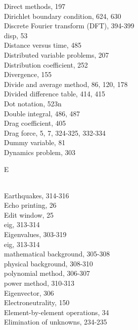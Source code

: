 \documentclass[../main.tex]{subfiles}
\begin{document}
\begin{multicols}{3}
    Direct methods, 197\\
    Dirichlet boundary condition, 624, 630\\
    Discrete Fourier transform (DFT), 394-399\\
    disp, 53\\
    Distance versus time, 485\\
    Distributed variable problems, 207\\
    Distribution coefficient, 252\\
    Divergence, 155\\
    Divide and average method, 86, 120, 178\\
    Divided difference table, 414, 415\\
    Dot notation, 523n\\
    Double integral, 486, 487\\
    Drag coefficient, 405\\
    Drag force, 5, 7, 324-325, 332-334\\
    Dummy variable, 81\\
    Dynamics problem, 303\vspace*{2mm}\\
    \begin{huge} E \end{huge}\\
    Earthquakes, 314-316\\
    Echo printing, 26\\
    Edit window, 25\\
    eig, 313-314\\
    Eigenvalues, 303-319\\
    \hspace*{3mm}eig, 313-314\\
    \hspace*{3mm}mathematical background, 305-308\\
    \hspace*{3mm}physical background, 308-310\\
    \hspace*{3mm}polynomial method, 306-307\\
    \hspace*{3mm}power method, 310-313\\
    Eigenvector, 306\\
    Electroneutrality, 150\\
    Element-by-element operations, 34\\
    Elimination of unknowns, 234-235\\

\end{multicols}
\end{document}
